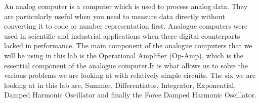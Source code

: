 An analog computer is a computer which is used to process analog data. They are particularly useful when you need to measure data directly without converting it to code or number representation first. Analogue computers were used in scientific and industrial applications when there digital counterparts lacked in performance. The main component of the analogue computers that we will be using in this lab is the Operational Amplifier (Op-Amp), which is the essential component of the analogue computer.It is what allows us to solve the various problems we are looking at with relatively simple circuits. The six we are looking at in this lab are, Summer, Differentiator, Integrator, Exponential, Damped Harmonic Oscillator and finally the Force Damped Harmonic Oscillator.
